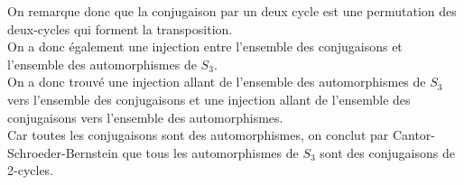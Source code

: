\documentclass[11pt, a4paper]{article}
\begin{document}
On remarque donc que la conjugaison par un deux cycle est une permutation des deux-cycles qui forment la transposition.\\
On a donc également une injection entre l'ensemble des conjugaisons et l'ensemble des automorphismes de $S_3$.\\
On a donc trouvé une injection allant de l'ensemble des automorphismes de $S_3$ vers l'ensemble des conjugaisons et une injection allant de l'ensemble des conjugaisons vers l'ensemble des automorphismes.\\
Car toutes les conjugaisons sont des automorphismes, on conclut par Cantor-Schroeder-Bernstein que tous les automorphismes de $S_3$ sont des conjugaisons de 2-cycles.
\end{document}
